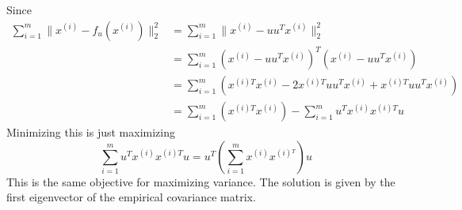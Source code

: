 \begin{answer}
    Since
$$
\begin{aligned}
\sum_{i=1}^m\|x^{(i)} - f_u(x^{(i)})\|_2^2 &= \sum_{i=1}^m\|x^{(i)} - uu^Tx^{(i)}\|^2_2\\
&= \sum_{i=1}^m (x^{(i)} - uu^Tx^{(i)})^T(x^{(i)} - uu^Tx^{(i)})\\
&= \sum_{i=1}^m (x^{(i)T}x^{(i)} -2 x^{(i)T}uu^Tx^{(i)} + x^{(i)T}uu^Tx^{(i)})\\
&= \sum_{i=1}^m (x^{(i)T}x^{(i)}) - \sum_{i=1}^m u^Tx^{(i)}x^{(i)T}u
\end{aligned}
$$
Minimizing this is just maximizing
$$
\sum_{i=1}^m u^Tx^{(i)}x^{(i)T}u = u^T(\sum_{i=1}^mx^{(i)}x^{(i){^T}}) u
$$
This is the same objective for maximizing variance. The solution is given by the first eigenvector of the empirical covariance matrix.





\end{answer}
